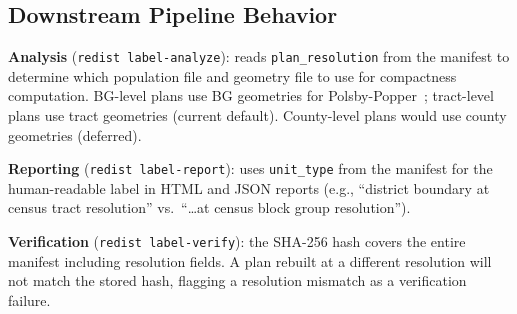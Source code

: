\subsection{Downstream Pipeline Behavior}

\textbf{Analysis} (\texttt{redist label-analyze}): reads
\texttt{plan\_resolution} from the manifest to determine which population
file and geometry file to use for compactness computation.
BG-level plans use BG geometries for Polsby-Popper~\citep{polsby1991third};
tract-level plans use tract geometries (current default).
County-level plans would use county geometries (deferred).

\textbf{Reporting} (\texttt{redist label-report}): uses \texttt{unit\_type}
from the manifest for the human-readable label in HTML and JSON reports
(e.g., ``district boundary at census tract resolution'' vs.\ ``\ldots at
census block group resolution'').

\textbf{Verification} (\texttt{redist label-verify}): the SHA-256 hash
covers the entire manifest including resolution fields.
A plan rebuilt at a different resolution will not match the stored hash,
flagging a resolution mismatch as a verification failure.
